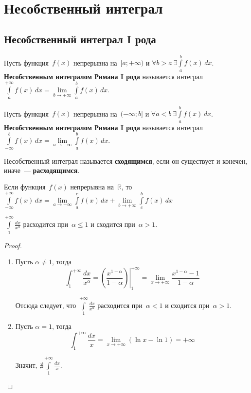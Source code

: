 \section{Несобственный интеграл}

\subsection{Несобственный интеграл I рода}
Пусть функция~$f(x)$ непрерывна на~$[a; +\infty)$ и $\forall b > a \ \exists \int\limits_a^b f(x)\,dx$.
\textbf{Несобственным интегралом Римана I рода} называется интеграл $\int\limits_a^{+\infty} f(x)\,dx = \lim\limits_{b \to +\infty} \int\limits_a^b f(x)\,dx$.

Пусть функция~$f(x)$ непрерывна на~$(-\infty; b]$ и $\forall a < b \ \exists \int\limits_a^b f(x)\,dx$.
\textbf{Несобственным интегралом Римана I рода} называется интеграл $\int\limits_{-\infty}^b f(x)\,dx = \lim\limits_{a \to -\infty} \int\limits_a^b f(x)\,dx$.

Несобственный интеграл называется \textbf{сходящимся}, если он существует и конечен, иначе~--- \textbf{расходящимся}.

Если функция~$f(x)$ непрерывна на~$\mathbb R$, то
$\int\limits_{-\infty}^{+\infty} f(x)\,dx =
\lim\limits_{a \to -\infty} \int\limits_a^c f(x)\,dx + \lim\limits_{b \to +\infty} \int\limits_c^b f(x)\,dx$

\begin{statement}
\label{st:improper_int_1_div_x}
$\int\limits_1^{+\infty} \frac{dx}{x^\alpha}$ расходится при~$\alpha \leqslant 1$ и сходится при~$\alpha > 1$.
\end{statement}
\begin{proof}
\begin{enumerate}
	\item Пусть $\alpha \neq 1$, тогда
	\begin{equation*}
	\int_1^{+\infty} \frac{dx}{x^\alpha} =
	\left.\left( \frac{x^{1-\alpha}}{1 - \alpha} \right)\right|_1^{+\infty} =
	\lim_{x \to +\infty} \frac{x^{1-\alpha} - 1}{1 - \alpha}
	\end{equation*}
	
	Отсюда следует, что $\int\limits_1^{+\infty} \frac{dx}{x^\alpha}$ расходится при~$\alpha < 1$ и сходится при~$\alpha > 1$.
	
	\item Пусть $\alpha = 1$, тогда
	\begin{equation*}
	\int_1^{+\infty} \frac{dx}{x} =
	\lim_{x \to +\infty} (\ln x - \ln 1) = +\infty
	\end{equation*}
	
	Значит, $\nexists \int\limits_1^{+\infty} \frac{dx}x$.
\end{enumerate}
\end{proof}

